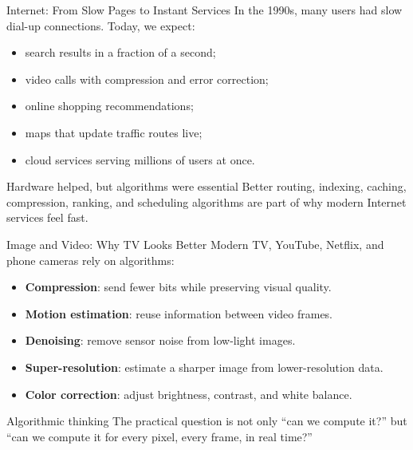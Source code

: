 \documentclass[aspectratio=169,xcolor=dvipsnames]{beamer}
\begin{document}
\begin{frame}{Internet: From Slow Pages to Instant Services}
  In the 1990s, many users had slow dial-up connections. Today, we expect:
  \begin{itemize}
    \item search results in a fraction of a second;
    \item video calls with compression and error correction;
    \item online shopping recommendations;
    \item maps that update traffic routes live;
    \item cloud services serving millions of users at once.
  \end{itemize}
  \vspace{0.6em}
  \begin{exampleblock}{Hardware helped, but algorithms were essential}
    Better routing, indexing, caching, compression, ranking, and scheduling algorithms are part of why modern Internet services feel fast.
  \end{exampleblock}
\end{frame}

\begin{frame}{Image and Video: Why TV Looks Better}
  Modern TV, YouTube, Netflix, and phone cameras rely on algorithms:
  \begin{itemize}
    \item \textbf{Compression}: send fewer bits while preserving visual quality.
    \item \textbf{Motion estimation}: reuse information between video frames.
    \item \textbf{Denoising}: remove sensor noise from low-light images.
    \item \textbf{Super-resolution}: estimate a sharper image from lower-resolution data.
    \item \textbf{Color correction}: adjust brightness, contrast, and white balance.
  \end{itemize}
  \vspace{0.5em}
  \begin{block}{Algorithmic thinking}
    The practical question is not only ``can we compute it?'' but ``can we compute it for every pixel, every frame, in real time?''
  \end{block}
\end{frame}
\end{document}
